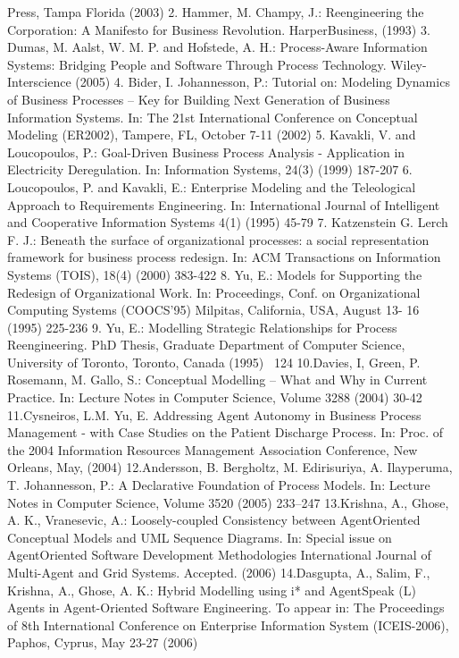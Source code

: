 Press, Tampa Florida (2003)
2. Hammer, M. Champy, J.: Reengineering the Corporation: A Manifesto for Business Revolution. HarperBusiness, (1993)
3. Dumas, M. Aalst, W. M. P. and Hofstede, A. H.: Process-Aware Information Systems:
Bridging People and Software Through Process Technology. Wiley-Interscience (2005)
4. Bider, I. Johannesson, P.: Tutorial on: Modeling Dynamics of Business Processes – Key for
Building Next Generation of Business Information Systems. In: The 21st International Conference on Conceptual Modeling (ER2002), Tampere, FL, October 7-11 (2002)
5. Kavakli, V. and Loucopoulos, P.: Goal-Driven Business Process Analysis - Application in
Electricity Deregulation. In: Information Systems, 24(3) (1999) 187-207
6. Loucopoulos, P. and Kavakli, E.: Enterprise Modeling and the Teleological Approach to
Requirements Engineering. In: International Journal of Intelligent and Cooperative Information Systems 4(1) (1995) 45-79
7. Katzenstein G. Lerch F. J.: Beneath the surface of organizational processes: a social representation framework for business process redesign. In: ACM Transactions on Information
Systems (TOIS), 18(4) (2000) 383-422
8. Yu, E.: Models for Supporting the Redesign of Organizational Work. In: Proceedings, Conf.
on Organizational Computing Systems (COOCS'95) Milpitas, California, USA, August 13-
16 (1995) 225-236
9. Yu, E.: Modelling Strategic Relationships for Process Reengineering. PhD Thesis, Graduate
Department of Computer Science, University of Toronto, Toronto, Canada (1995) ~124
10.Davies, I, Green, P. Rosemann, M. Gallo, S.: Conceptual Modelling – What and Why in
Current Practice. In: Lecture Notes in Computer Science, Volume 3288 (2004) 30-42
11.Cysneiros, L.M. Yu, E. Addressing Agent Autonomy in Business Process Management -
with Case Studies on the Patient Discharge Process. In: Proc. of the 2004 Information Resources Management Association Conference, New Orleans, May, (2004)
12.Andersson, B. Bergholtz, M. Edirisuriya, A. Ilayperuma, T. Johannesson, P.: A Declarative
Foundation of Process Models. In: Lecture Notes in Computer Science, Volume 3520
(2005) 233–247
13.Krishna, A., Ghose, A. K., Vranesevic, A.: Loosely-coupled Consistency between AgentOriented Conceptual Models and UML Sequence Diagrams. In: Special issue on AgentOriented Software Development Methodologies International Journal of Multi-Agent and
Grid Systems. Accepted. (2006)
14.Dasgupta, A., Salim, F., Krishna, A., Ghose, A. K.: Hybrid Modelling using i* and AgentSpeak (L) Agents in Agent-Oriented Software Engineering. To appear in: The Proceedings of
8th International Conference on Enterprise Information System (ICEIS-2006), Paphos, Cyprus, May 23-27 (2006)
